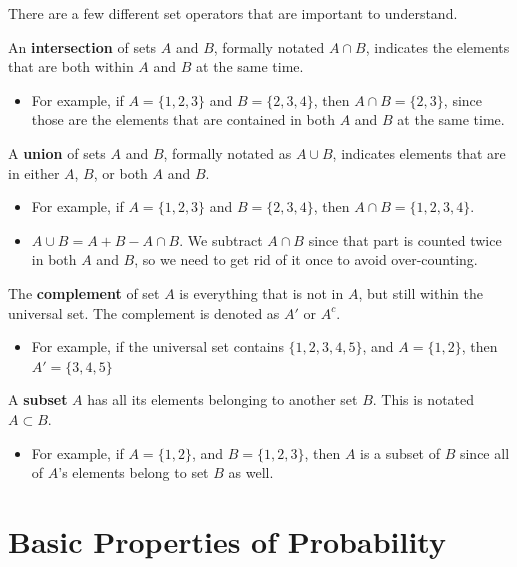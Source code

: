 \documentclass[
  a4paper,
]{report}
\providecommand{\tightlist}{%
  \setlength{\itemsep}{0pt}\setlength{\parskip}{0pt}}\usepackage{longtable,booktabs,array}
\begin{document}
There are a few different set operators that are important to
understand.

An \textbf{intersection} of sets \(A\) and \(B\), formally notated
\(A \cap B\), indicates the elements that are both within \(A\) and
\(B\) at the same time.

\begin{itemize}
\tightlist
\item
  For example, if \(A = \{1,2,3\}\) and \(B = \{2,3,4\}\), then
  \(A \cap B = \{2, 3\}\), since those are the elements that are
  contained in both \(A\) and \(B\) at the same time.
\end{itemize}

A \textbf{union} of sets \(A\) and \(B\), formally notated as
\(A \cup B\), indicates elements that are in either \(A\), \(B\), or
both \(A\) and \(B\).

\begin{itemize}
\tightlist
\item
  For example, if \(A = \{1,2,3\}\) and \(B = \{2,3,4\}\), then
  \(A \cap B = \{1,2, 3,4\}\).
\item
  \(A \cup B = A + B -A \cap B\). We subtract \(A \cap B\) since that
  part is counted twice in both \(A\) and \(B\), so we need to get rid
  of it once to avoid over-counting.
\end{itemize}

The \textbf{complement} of set \(A\) is everything that is not in \(A\),
but still within the universal set. The complement is denoted as \(A'\)
or \(A^c\).

\begin{itemize}
\tightlist
\item
  For example, if the universal set contains \(\{1,2,3,4,5\}\), and
  \(A = \{1,2\}\), then \(A' = \{3,4,5\}\)
\end{itemize}

A \textbf{subset} \(A\) has all its elements belonging to another set
\(B\). This is notated \(A \subset B\).

\begin{itemize}
\tightlist
\item
  For example, if \(A = \{1,2\}\), and \(B = \{1,2,3\}\), then \(A\) is
  a subset of \(B\) since all of \(A\)'s elements belong to set \(B\) as
  well.
\end{itemize}

\section{Basic Properties of
Probability}\label{basic-properties-of-probability}
\end{document}
